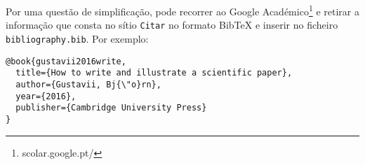 Por uma questão de simplificação, pode recorrer ao  Google Académico\footnote{scolar.google.pt/} e retirar a informação que consta no sítio \texttt{Citar} no formato BibTeX e inserir no ficheiro \texttt{bibliography.bib}. Por exemplo:
\begin{verbatim}
@book{gustavii2016write,
  title={How to write and illustrate a scientific paper},
  author={Gustavii, Bj{\"o}rn},
  year={2016},
  publisher={Cambridge University Press}
}
\end{verbatim}